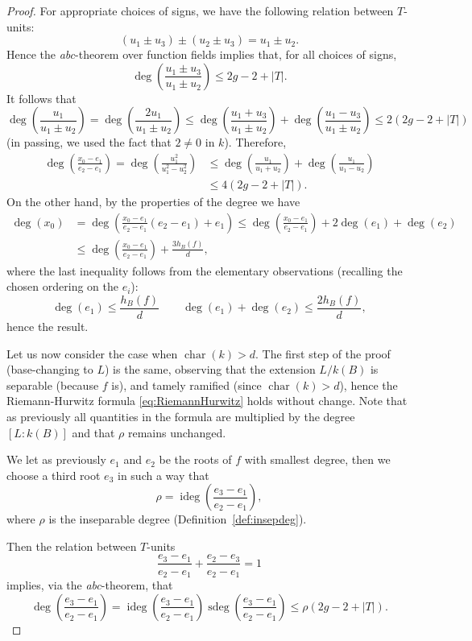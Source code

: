 \documentclass[11pt]{article}
\theoremstyle{plain}
\theoremstyle{definition}
\DeclareMathOperator{\degi}{ideg}
\DeclareMathOperator{\degs}{sdeg}
\DeclareMathOperator{\car}{char}
\begin{document}
\begin{proof}
For appropriate choices of signs, we have the following relation between $T$-units:
\begin{equation}
\label{eq:relationu_i}
(u_1 \pm u_3) \pm (u_2 \pm u_3) = u_1 \pm u_2.
\end{equation}
Hence the \emph{abc}-theorem over function fields \cite{silverman84} implies that, for all choices of signs,
$$
\deg\left(\frac{u_1 \pm u_3}{u_1 \pm u_2}\right) \leq 2g-2+|T|.
$$
It follows that
$$
\deg\left(\frac{u_1}{u_1 \pm u_2}\right)=\deg\left(\frac{2u_1}{u_1 \pm u_2}\right) \leq \deg\left(\frac{u_1 + u_3}{u_1 \pm u_2}\right) + \deg\left(\frac{u_1 - u_3}{u_1 \pm u_2}\right) \leq 2(2g-2+|T|)
$$
(in passing, we used the fact that $2\neq 0$ in $k$). Therefore,
\begin{align*}
\deg\left(\frac{x_0-e_1}{e_2-e_1}\right) = \deg\left(\frac{u_1^2}{u_1^2-u_2^2}\right) &\leq \deg\left(\frac{u_1}{u_1 + u_2}\right) + \deg\left(\frac{u_1}{u_1 - u_2}\right) \\
                                &\leq 4(2g-2+|T|).
\end{align*}
On the other hand, by the properties of the degree we have
\begin{align*}
\deg(x_0)&=\deg\left(\frac{x_0-e_1}{e_2-e_1}(e_2-e_1)+e_1\right) \leq \deg\left(\frac{x_0-e_1}{e_2-e_1}\right) + 2\deg(e_1)+ \deg(e_2) \\
&\leq \deg\left(\frac{x_0-e_1}{e_2-e_1}\right) + \frac{3h_B(f)}{d},
\end{align*}
where the last inequality follows from the elementary observations (recalling the chosen ordering on the $e_i$):
$$
\deg(e_1)\leq \frac{h_B(f)}{d} \qquad \deg(e_1)+ \deg(e_2) \leq \frac{2h_B(f)}{d},
$$
hence the result.

Let us now consider the case when $\car(k)>d$. The first step of the proof (base-changing to $L$) is the same, observing that the extension $L/k(B)$ is separable (because $f$ is), and tamely ramified (since $\car(k)>d$), hence the Riemann-Hurwitz formula \eqref{eq:RiemannHurwitz} holds without change. Note that as previously all quantities in the formula are multiplied by the degree $[L:k(B)]$ and that $\rho$ remains unchanged.

We let as previously $e_1$ and $e_2$ be the roots of $f$ with smallest degree, then we choose a third root $e_3$ in such a way that
$$
\rho = \degi\left(\frac{e_3 - e_1}{e_2 - e_1}\right),
$$
where $\rho$ is the inseparable degree (Definition~\ref{def:insepdeg}).

Then the relation between $T$-units
$$
\frac{e_3 - e_1}{e_2 - e_1} + \frac{e_2 - e_3}{e_2 - e_1} =1
$$
implies, via the \emph{abc}-theorem, that
$$
\deg\left(\frac{e_3 - e_1}{e_2 - e_1}\right) = \degi\left(\frac{e_3 - e_1}{e_2 - e_1}\right)\degs\left(\frac{e_3 - e_1}{e_2 - e_1}\right) \leq \rho(2g-2+|T|).
$$


\end{proof}
\end{document}
